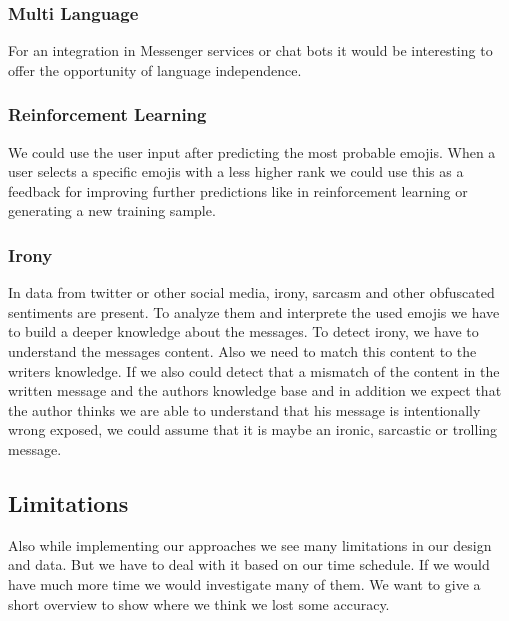 \documentclass{article}
\begin{document}
\subsubsection{Multi Language}
For an integration in Messenger services or chat bots it would be interesting to offer the opportunity of language independence.

\subsubsection{Reinforcement Learning}
We could use the user input after predicting the most probable emojis. When a user selects a specific emojis with a less higher rank we could use this as a feedback for improving further predictions like in reinforcement learning or generating a new training sample.

\subsubsection{Irony}
In data from twitter or other social media, irony, sarcasm and other obfuscated sentiments are present. To analyze them and interprete the used emojis we have to build a deeper knowledge about the messages. To detect irony, we have to understand the messages content. Also we need to match this content to the writers knowledge. If we also could detect that a mismatch of the content in the written message and the authors knowledge base and in addition we expect that the author thinks we are able to understand that his message is intentionally wrong exposed, we could assume that it is maybe an ironic, sarcastic or trolling message.

\subsection{Limitations}
Also while implementing our approaches we see many limitations in our design and data. But we have to deal with it based on our time schedule. If we would have much more time we would investigate many of them. We want to give a short overview  to show where we think we lost some accuracy.
\end{document}
